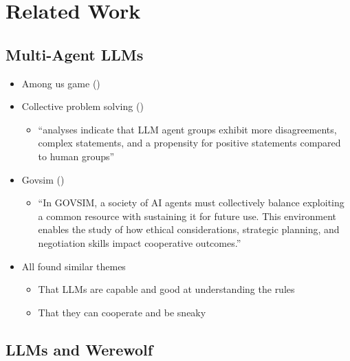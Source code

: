 \documentclass[
  letterpaper,
  DIV=11,
  numbers=noendperiod]{scrreprt}
\providecommand{\tightlist}{%
  \setlength{\itemsep}{0pt}\setlength{\parskip}{0pt}}
\begin{document}
\section{Related Work}\label{related-work}

\subsection{Multi-Agent LLMs}\label{multi-agent-llms}

\begin{itemize}
\tightlist
\item
  Among us game ()
\item
  Collective problem solving
  ()

  \begin{itemize}
  \tightlist
  \item
    ``analyses indicate that LLM agent groups exhibit more
    disagreements, complex statements, and a propensity for positive
    statements compared to human groups''
  \end{itemize}
\item
  Govsim ()

  \begin{itemize}
  \tightlist
  \item
    ``In GOVSIM, a society of AI agents must collectively balance
    exploiting a common resource with sustaining it for future use. This
    environment enables the study of how ethical considerations,
    strategic planning, and negotiation skills impact cooperative
    outcomes.''
  \end{itemize}
\item
  All found similar themes

  \begin{itemize}
  \tightlist
  \item
    That LLMs are capable and good at understanding the rules
  \item
    That they can cooperate and be sneaky
  \end{itemize}
\end{itemize}

\subsection{LLMs and Werewolf}\label{llms-and-werewolf}
\end{document}
